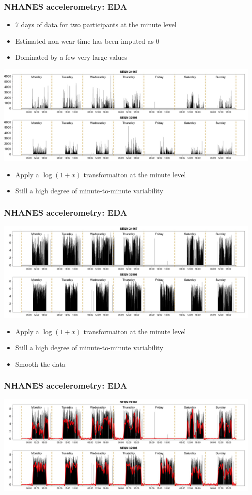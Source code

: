 \documentclass[10pt]{beamer}\usepackage[]{graphicx}\usepackage[]{color}
\begin{document}
\begin{frame}
\frametitle{NHANES accelerometry: EDA}
\begin{itemize}
\item 7 days of data for two participants at the minute level
\item Estimated non-wear time has been imputed as 0
\item Dominated by a few very large values
\end{itemize}
\includegraphics[width=\textwidth]{individual_profiles_raw}
\end{frame}

\begin{frame}
\begin{itemize}
\item Apply a $\log(1+x)$ transformaiton at the minute level
\item Still a high degree of minute-to-minute variability
\end{itemize}
\frametitle{NHANES accelerometry: EDA}
\includegraphics[width=\textwidth]{individual_profiles_trans}
\end{frame}


\begin{frame}
\begin{itemize}
\item Apply a $\log(1+x)$ transformaiton at the minute level
\item Still a high degree of minute-to-minute variability
\item Smooth the data
\end{itemize}
\frametitle{NHANES accelerometry: EDA}
\includegraphics[width=\textwidth]{individual_profiles_trans_sm}
\end{frame}
\end{document}
